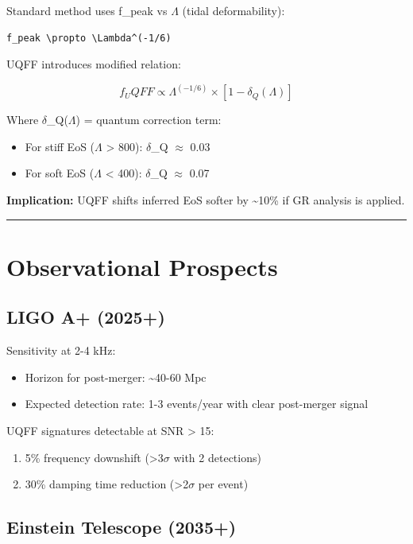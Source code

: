 \documentclass[12pt,a4paper]{article}
\begin{document}
Standard method uses f\_peak vs $\Lambda$ (tidal deformability):

\begin{verbatim}
f_peak \propto \Lambda^(-1/6)
\end{verbatim}

UQFF introduces modified relation:

\begin{equation}
f_UQFF \propto \Lambda^(-1/6) \times [1 - \delta_Q(\Lambda)]
\end{equation}

Where $\delta$\_Q($\Lambda$) = quantum correction term:

\begin{itemize}
  \item For stiff EoS ($\Lambda$ > 800): $\delta$\_Q $\approx$ 0.03
  \item For soft EoS ($\Lambda$ < 400): $\delta$\_Q $\approx$ 0.07
\end{itemize}

\textbf{Implication:} UQFF shifts inferred EoS softer by \textasciitilde{}10\% if GR analysis is applied.

\medskip\hrule\medskip

\section{Observational Prospects}

\subsection{LIGO A+ (2025+)}

Sensitivity at 2-4 kHz:

\begin{itemize}
  \item Horizon for post-merger: \textasciitilde{}40-60 Mpc
  \item Expected detection rate: 1-3 events/year with clear post-merger signal
\end{itemize}

UQFF signatures detectable at SNR > 15:

\begin{enumerate}
  \item 5\% frequency downshift (>3$\sigma$ with 2 detections)
  \item 30\% damping time reduction (>2$\sigma$ per event)
\end{enumerate}

\subsection{Einstein Telescope (2035+)}
\end{document}
